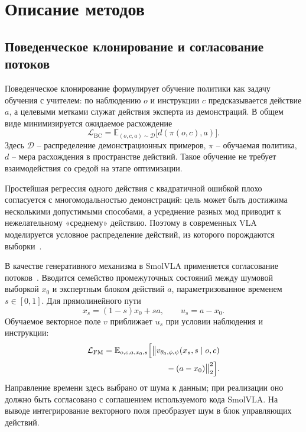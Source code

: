 \documentclass{misisarticle}
\begin{document}
\section{Описание методов}

\subsection{Поведенческое клонирование и согласование потоков}

Поведенческое клонирование формулирует обучение политики как задачу обучения с учителем: по наблюдению $o$ и инструкции $c$ предсказывается действие $a$, а целевыми метками служат действия эксперта из демонстраций. В общем виде минимизируется ожидаемое расхождение
\begin{equation}
  \mathcal{L}_{\mathrm{BC}}=\mathbb{E}_{(o,c,a)\sim\mathcal{D}}
  \bigl[d(\pi(o,c),a)\bigr].
\end{equation}
Здесь $\mathcal{D}$ -- распределение демонстрационных примеров, $\pi$ -- обучаемая политика, $d$ -- мера расхождения в пространстве действий. Такое обучение не требует взаимодействия со средой на этапе оптимизации.

Простейшая регрессия одного действия с квадратичной ошибкой плохо согласуется с многомодальностью демонстраций: цель может быть достижима несколькими допустимыми способами, а усреднение разных мод приводит к нежелательному «среднему» действию. Поэтому в современных VLA моделируется условное распределение действий, из которого порождаются выборки~\cite{octo,smolvla}.

В качестве генеративного механизма в SmolVLA применяется согласование потоков~\cite{smolvla,flowmatching}. Вводится семейство промежуточных состояний между шумовой выборкой $x_0$ и экспертным блоком действий $a$, параметризованное временем $s\in[0,1]$. Для прямолинейного пути
\begin{equation}
  x_s=(1-s)x_0+sa,\qquad u_s=a-x_0.
\end{equation}
Обучаемое векторное поле $v$ приближает $u_s$ при условии наблюдения и инструкции:
\begin{equation}
\begin{split}
  \mathcal{L}_{\mathrm{FM}}=\mathbb{E}_{o,c,a,x_0,s}\Bigl[
  \bigl\|v_{\theta_0,\phi,\psi}(x_s,s\mid o,c)\\
  {}-(a-x_0)\bigr\|_2^2\Bigr].
\end{split}
\label{eq:fm}
\end{equation}
Направление времени здесь выбрано от шума к данным; при реализации оно должно быть согласовано с соглашением используемого кода SmolVLA. На выводе интегрирование векторного поля преобразует шум в блок управляющих действий.
\end{document}
